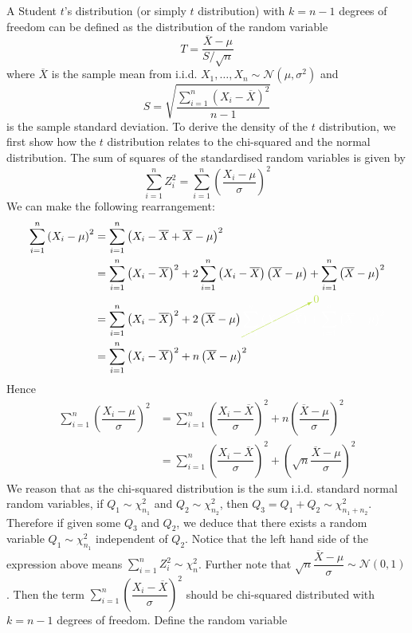 \documentclass[11pt]{report} %
\begin{document}
A Student $t$'s distribution (or simply $t$ distribution) with $k = n - 1$ degrees of freedom can be defined as the distribution of the random variable
\begin{equation}
T = \dfrac{\overline{X} - \mu}{S/\sqrt{n}}
\end{equation}
where $\overline{X}$ is the sample mean from i.i.d. $X_{1}, \dots, X_{n} \sim \mathcal{N}\left(\mu, \sigma^{2}\right)$ and
\begin{equation}
S = \sqrt{\dfrac{\sum_{i = 1}^{n}\left(X_{i} - \overline{X}\right)^{2}}{n - 1}}
\end{equation}
is the sample standard deviation. To derive the density of the $t$ distribution, we first show how the $t$ distribution relates to the chi-squared and the normal distribution. The sum of squares of the standardised random variables is given by
\begin{equation}
\sum_{i = 1}^{n}Z_{i}^{2} = \sum_{i = 1}^{n}\left(\dfrac{X_{i} - \mu}{\sigma}\right)^{2}
\end{equation}
We can make the following rearrangement:
\begin{align}
\sum_{i = 1}^{n}\left(X_{i} - \mu\right)^{2} &= \sum_{i = 1}^{n}\left(X_{i} -  \overline{X} + \overline{X} - \mu\right)^{2} \\
&= \sum_{i=1}^{n}\left(X_{i}-\overline{X}\right)^{2}+2\sum_{i=1}^{n}\left(X_{i}-\overline{X}\right)\left(\overline{X}-\mu\right)+\sum_{i=1}^{n}\left(\overline{X}-\mu\right)^{2} \\
&= \sum_{i=1}^{n}\left(X_{i}-\overline{X}\right)^{2}+2\left(\overline{X}-\mu\right)\green\cancelto{0}{\black\sum_{i=1}^{n}\left(X_{i}-\overline{X}\right)}\black+\sum_{i=1}^{n}\left(\overline{X}-\mu\right)^{2} \\
&= \sum_{i=1}^{n}\left(X_{i}-\overline{X}\right)^{2}+n\left(\overline{X}-\mu\right)^{2}
\end{align}
Hence
\begin{align}
\sum_{i = 1}^{n}\left(\dfrac{X_{i} - \mu}{\sigma}\right)^{2} &= \sum_{i=1}^{n}\left(\dfrac{X_{i}-\overline{X}}{\sigma}\right)^{2}+n\left(\dfrac{\overline{X}-\mu}{\sigma}\right)^{2} \\
&= \sum_{i=1}^{n}\left(\dfrac{X_{i}-\overline{X}}{\sigma}\right)^{2}+\left(\sqrt{n}\dfrac{\overline{X}-\mu}{\sigma}\right)^{2}
\end{align}
We reason that as the chi-squared distribution is the sum i.i.d. standard normal random variables, if $Q_{1}\sim\chi_{n_{1}}^{2}$ and $Q_{2}\sim\chi_{n_{2}}^{2}$, then $Q_{3} = Q_{1} + Q_{2} \sim \chi_{n_{1} + n_{2}}^{2}$. Therefore if given some $Q_{3}$ and $Q_{2}$, we deduce that there exists a random variable $Q_{1} \sim \chi_{n_{1}}^{2}$ independent of $Q_{2}$. Notice that the left hand side of the expression above means $\sum_{i = 1}^{n}Z_{i}^{2} \sim \chi_{n}^{2}$. Further note that $\sqrt{n}\dfrac{\overline{X}-\mu}{\sigma} \sim \mathcal{N}\left(0, 1\right)$. Then the term $\sum_{i=1}^{n}\left(\dfrac{X_{i}-\overline{X}}{\sigma}\right)^{2}$ should be chi-squared distributed with $k = n - 1$ degrees of freedom. Define the random variable
\end{document}
